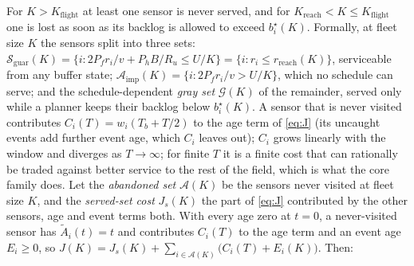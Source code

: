 \documentclass[journal,outdir=./]{IEEEtran}
\newcommand{\Kr}{K_{\mathrm{reach}}}
\newcommand{\Pf}{P_{f}}
\newcommand{\Ph}{P_{h}}
\newcommand{\Ru}{R_u}
\begin{document}
For $K>K_{\mathrm{flight}}$ at least one sensor is never served, and for $\Kr<K\le K_{\mathrm{flight}}$ one is lost as soon as its backlog is allowed to exceed $b^{\star}_i(K)$. Formally, at fleet size $K$ the sensors split into three sets: $\mathcal{S}_{\mathrm{guar}}(K)=\{i:2\Pf r_i/v+\Ph B/\Ru\le U/K\}=\{i:r_i\le r_{\mathrm{reach}}(K)\}$, serviceable from any buffer state; $\mathcal{A}_{\mathrm{imp}}(K)=\{i:2\Pf r_i/v>U/K\}$, which no schedule can serve; and the schedule-dependent \emph{gray set} $\mathcal{G}(K)$ of the remainder, served only while a planner keeps their backlog below $b^{\star}_i(K)$. A sensor that is never visited contributes $C_i(T)=w_i(T_b+T/2)$ to the age term of \eqref{eq:J} (its uncaught events add further event age, which $C_i$ leaves out); $C_i$ grows linearly with the window and diverges as $T\to\infty$; for finite $T$ it is a finite cost that can rationally be traded against better service to the rest of the field, which is what the core family does. Let the \emph{abandoned set} $\mathcal{A}(K)$ be the sensors never visited at fleet size $K$, and the \emph{served-set cost} $J_s(K)$ the part of \eqref{eq:J} contributed by the other sensors, age and event terms both. With every age zero at $t=0$, a never-visited sensor has $\tilde A_i(t)=t$ and contributes $C_i(T)$ to the age term and an event age $E_i\ge0$, so $J(K)=J_s(K)+\sum_{i\in\mathcal{A}(K)}\big(C_i(T)+E_i(K)\big)$. Then:
\end{document}
